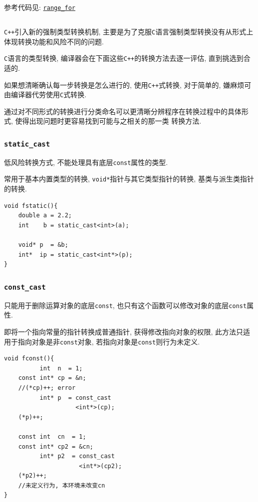 参考代码见: \href{https://github.com/wenqingqian/Obtuse/blob/main/test/cpp/c++11/range_for.cpp}{\tt range\_for}
\subsection{\color{purple}{强制类型转换}}
{\tt C++}引入新的强制类型转换机制, 主要是为了克服{\tt C}语言强制类型转换没有从形式上体现转换功能和风险不同的问题.

{\tt C}语言的类型转换, 编译器会在下面这些{\tt C++}的转换方法去逐一评估, 直到挑选到合适的. 

如果想清晰确认每一步转换是怎么进行的, 使用{\tt C++}式转换, 对于简单的, 嫌麻烦可由编译器代劳使用{\tt C}式转换.

通过对不同形式的转换进行分类命名可以更清晰分辨程序在转换过程中的具体形式, 使得出现问题时更容易找到可能与之相关的那一类
	转换方法. 
\subsubsection{\tt{static\_cast}}
\begin{paracol}{2}
	\begin{leftcolumn}
		低风险转换方式, 不能处理具有底层{\tt const}属性的类型.

		常用于基本内置类型的转换, {\tt void*}指针与其它类型指针的转换, 基类与派生类指针的转换.
	\end{leftcolumn}	
	\begin{rightcolumn}
		\begin{lstlisting}[xleftmargin=2em,xrightmargin=2em]
void fstatic(){
	double a = 2.2;
	int    b = static_cast<int>(a);

	void* p  = &b;
	int*  ip = static_cast<int*>(p);
}
		\end{lstlisting}
	\end{rightcolumn}
\end{paracol}
\subsubsection{\tt{const\_cast}}
\begin{paracol}{2}
	\begin{leftcolumn}
		只能用于删除运算对象的底层{\tt const}, 也只有这个函数可以修改对象的底层{\tt const}属性.

		即将一个指向常量的指针转换成普通指针, 获得修改指向对象的权限, 此方法只适用于指向对象是非{\tt const}对象, 
			若指向对象是{\tt const}则行为未定义.
	\end{leftcolumn}	
	\begin{rightcolumn}
		\begin{lstlisting}[xleftmargin=2em,xrightmargin=2em]
void fconst(){
		  int  n  = 1;
	const int* cp = &n;
	//(*cp)++; error
	      int* p  = const_cast
		  			<int*>(cp);
	(*p)++;

	const int  cn  = 1;
	const int* cp2 = &cn;
		  int* p2  = const_cast
		  			 <int*>(cp2);
	(*p2)++;
	//未定义行为, 本环境未改变cn
}
		\end{lstlisting}
	\end{rightcolumn}
\end{paracol}

